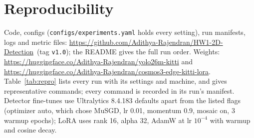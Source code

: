 \documentclass[conference]{IEEEtran}
\newcommand{\repourl}{\url{https://github.com/Adithya-Rajendran/HW1-2D-Detection}}
\begin{document}
\appendix
\section*{Reproducibility}\label{app:repro}
{\sloppy
Code, configs (\texttt{configs/experiments.yaml} holds every setting), run manifests, logs and metric files:
\repourl\ (tag \texttt{v1.0}); the README gives the full run order. Weights:
\url{https://huggingface.co/Adithya-Rajendran/yolo26m-kitti} and
\url{https://huggingface.co/Adithya-Rajendran/cosmos3-edge-kitti-lora}. Table~\ref{tab:repro} lists every run with its
settings and machine, and gives representative commands; every command is recorded in its run's manifest. Detector
fine-tunes use Ultralytics 8.4.183 defaults apart from the listed flags (optimizer auto, which chose MuSGD, lr 0.01,
momentum 0.9, mosaic on, 3 warmup epochs); LoRA uses rank 16, alpha 32, AdamW at lr $10^{-4}$ with warmup and cosine
decay.\par}
\end{document}
